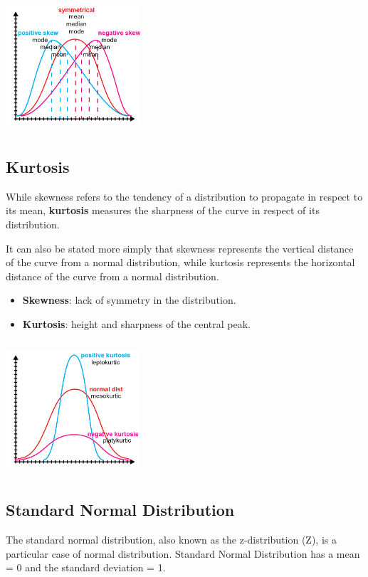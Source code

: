 \documentclass{article}
\begin{document}
\includegraphics[width=5cm, height=5cm]{skew}

\subsection{Kurtosis}
While skewness refers to the tendency of a distribution to propagate in respect to its mean, \textbf{kurtosis} measures the sharpness of the curve in respect of its distribution. 

It can also be stated more simply that skewness represents the vertical distance of the curve from a normal distribution, while kurtosis represents the horizontal distance of the curve from a normal distribution.    

\begin{itemize}
    \item \textbf{Skewness}: lack of symmetry in the distribution.
    \item \textbf{Kurtosis}: height and sharpness of the central peak.
\end{itemize}

\includegraphics[width=5cm, height=5cm]{kurtosis}

\subsection{Standard Normal Distribution}
The standard normal distribution, also known as the z-distribution (Z), is a particular case of normal distribution. Standard Normal Distribution has a mean = 0 and the standard deviation = 1.
\end{document}
